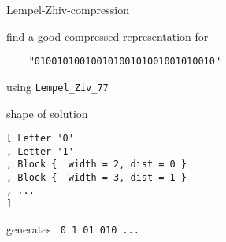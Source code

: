\begin{slide}{Lempel-Zhiv-compression}

find a good compressed representation for
\begin{verbatim}
    "01001010010010100101001001010010"
\end{verbatim}
using  \verb|Lempel_Ziv_77|

\bigskip

shape of solution
\begin{verbatim}
[ Letter '0'
, Letter '1'
, Block {  width = 2, dist = 0 }
, Block {  width = 3, dist = 1 }
, ...
]
\end{verbatim}

generates \verb| 0 1 01 010 ... |

\end{slide}
